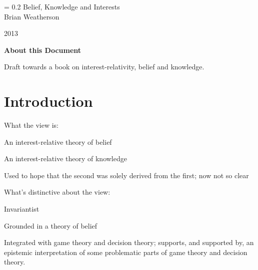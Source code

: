 \documentclass[11pt]{book}
\begin{document}
\setcounter{page}{-2}

\pagestyle{plain}
\fancyhf{}
\markboth{ }{}

\newlength{\drop}%
{\begingroup
\drop = 0.2\textheight
\centering
\vfill
{\Huge Belief, Knowledge and Interests}\\[\baselineskip]
{\large Brian Weatherson}\\[0.5\drop]
\vfill

{\large\scshape 2013}\par
\vfill\null
\endgroup}


\newpage

\begin{center}
{\bfseries \Large About this Document}
\end{center}

Draft towards a book on interest-relativity, belief and knowledge.

\section*{Introduction}
What the view is:
\begin{itemize*}
\item An interest-relative theory of belief
\item An interest-relative theory of knowledge
\item Used to hope that the second was solely derived from the first; now not so clear
\end{itemize*}
What's distinctive about the view:
\begin{itemize*}
\item Invariantist
\item Grounded in a theory of belief
\item Integrated with game theory and decision theory; supports, and supported by, an epistemic interpretation of some problematic parts of game theory and decision theory.
\end{itemize*}

\newpage

\setcounter{tocdepth}{0}
\tableofcontents

\fancyhf{}
\fancyhead[CE]{\textit \leftmark}
\fancyhead[LE]{\thepage}
\fancyhead[CO]{\textit \rightmark}
\fancyhead[RO]{\thepage}



















\end{document}
